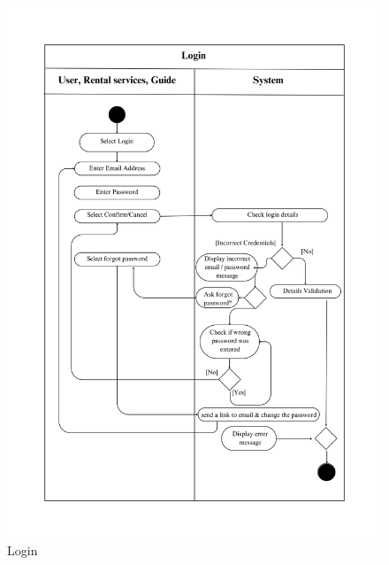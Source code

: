 \begin{figure}[h!]
    \centering
    \includegraphics[width=1\linewidth]{Images/Activity Diagrams/2 Login.png}
    \caption{Login}
\end{figure}

